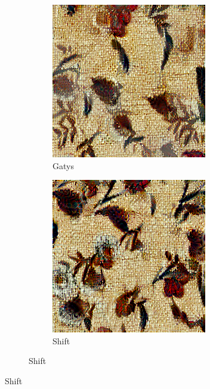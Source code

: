 \begin{figure}[ht]
\begin{subfigure}{0.8\textwidth}
\begin{subfigure}{0.32\textwidth}
            \includegraphics[width=\textwidth]{images/03-comparison_small_vanilla.jpg}
            \caption{Gatys}
            \label{fig:methods_comparison_small-vanilla}
        \end{subfigure}
        \hfill
        \begin{subfigure}{0.32\textwidth}
            \centering
            \includegraphics[width=\textwidth]{images/03-comparison_small_shift.jpg}
            \caption{Shift}
            \label{fig:methods_comparison_small-shift}
        \end{subfigure}
        

\end{subfigure}
\end{figure}
